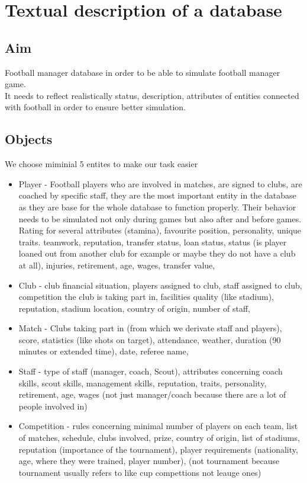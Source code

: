\documentclass{report}
\begin{document}
\chapter{Textual description of a database}
\section{Aim}

Football manager database in order to be able to simulate football manager game. \\ 
It needs to reflect realistically status, description, attributes of entities connected with football in order to ensure better simulation. \\ 


\section{Objects}
We choose miminial 5 entites to make our task easier \\ 
\begin{itemize}
    \item Player - Football players who are involved in matches, are signed to clubs, are coached by specific staff, they are the most important entity in the database as they are base for the whole database to function properly. Their behavior needs to be simulated not only during games but also after and before games. Rating for several attributes (stamina), favourite position, personality, unique traits. teamwork, reputation, transfer status, loan status, status (is player loaned out from another club for example or maybe they do not have a club at all), injuries, retirement, age, wages, transfer value, 
    \item Club - club financial situation, players assigned to club, staff assigned to club, competition the club is taking part in, facilities quality (like stadium), reputation, stadium location, country of origin, number of staff,
    \item Match - Clubs taking part in (from which we derivate staff and players), score, statistics (like shots on target), attendance, weather, duration (90 minutes or extended time), date, referee name,
    \item Staff - type of staff (manager, coach, Scout), attributes concerning coach skills, scout skills, management skills, reputation, traits, personality, retirement, age, wages  (not just manager/coach because there are a lot of people involved in)
    \item Competition - rules concerning minimal number of players on each team, list of matches, schedule, clubs involved, prize, country of origin, list of stadiums, reputation (importance of the tournament), player requirements (nationality, age, where they were trained, player number),   (not tournament because tournament usually refers to like cup compettions not leauge ones)
\end{itemize} 
\end{document}

